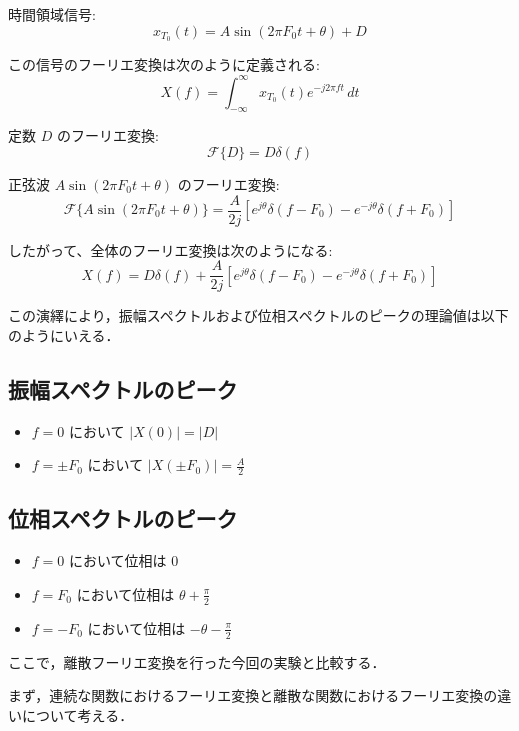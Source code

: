 \documentclass[fleqn, a4paper. 12pt]{jsarticle}
\begin{document}
      時間領域信号:
      $$
      x_{T_0}(t) = A \sin \left(2 \pi F_0 t + \theta \right) + D
      $$

      この信号のフーリエ変換は次のように定義される:
      $$
      X(f) = \int_{-\infty}^{\infty} x_{T_0}(t) e^{-j 2 \pi f t} \, dt
      $$

      定数 \( D \) のフーリエ変換:
      $$
      \mathcal{F}\{ D \} = D \delta(f)
      $$

      正弦波 \( A \sin \left(2 \pi F_0 t + \theta \right) \) のフーリエ変換:
      $$
      \mathcal{F}\{ A \sin \left(2 \pi F_0 t + \theta \right) \} = \frac{A}{2j} \left[ e^{j \theta} \delta(f - F_0) - e^{-j \theta} \delta(f + F_0) \right]
      $$

      したがって、全体のフーリエ変換は次のようになる:
      $$
      X(f) = D \delta(f) + \frac{A}{2j} \left[ e^{j \theta} \delta(f - F_0) - e^{-j \theta} \delta(f + F_0) \right]
      $$

      この演繹により，振幅スペクトルおよび位相スペクトルのピークの理論値は以下のようにいえる．

      \subsection*{振幅スペクトルのピーク}
        \begin{itemize}
            \item \( f = 0 \) において \( |X(0)| = |D| \)
            \item \( f = \pm F_0 \) において \( |X(\pm F_0)| = \frac{A}{2} \)
        \end{itemize}

        \subsection*{位相スペクトルのピーク}
        \begin{itemize}
            \item \( f = 0 \) において位相は \( 0 \)
            \item \( f = F_0 \) において位相は \( \theta + \frac{\pi}{2} \)
            \item \( f = -F_0 \) において位相は \( -\theta - \frac{\pi}{2} \)
      \end{itemize}

      ここで，離散フーリエ変換を行った今回の実験と比較する．

      まず，連続な関数におけるフーリエ変換と離散な関数におけるフーリエ変換の違いについて考える．
\end{document}

